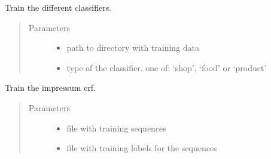 \documentclass[letterpaper,10pt,english]{sphinxmanual}
\begin{document}
\begin{fulllineitems}
\label{\detokenize{api:backend.train_clf}}
Train the different classifiers.
\begin{quote}\begin{description}
\item[{Parameters}] \leavevmode\begin{itemize}
\item {} 
 \textendash{} path to directory with training data

\item {} 
 \textendash{} type of the classifier. one of: ‘shop’, ‘food’ or ‘product’

\end{itemize}

\end{description}\end{quote}

\end{fulllineitems}


\begin{fulllineitems}
\label{\detokenize{api:backend.train_impressum}}
Train the impressum crf.
\begin{quote}\begin{description}
\item[{Parameters}] \leavevmode\begin{itemize}
\item {} 
 \textendash{} file with training sequences

\item {} 
 \textendash{} file with training labels for the sequences

\end{itemize}

\end{description}\end{quote}

\end{fulllineitems}

\end{document}
